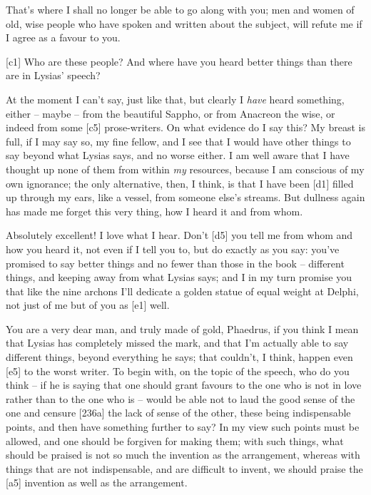  That's where I shall no longer be able to go along with you;
men and women of old, wise people who have spoken and written about the
subject, will refute me if I agree as a favour to you.

{[}c1{]}  Who are these people? And where have you heard better
things than there are in Lysias' speech?

 At the moment I can't say, just like that, but clearly I
{\em have} heard
something, either --
maybe -- from the beautiful Sappho, or from Anacreon the wise, or indeed
from some {[}c5{]}
prose-writers. On what
evidence do I say this? My breast is full, if I may say so, my fine
fellow, and I see that I would have other things to say beyond what
Lysias says, and no worse either. I am well aware that I have thought up
none of them from within {\em my} resources, because I am conscious of
my own ignorance; the only alternative, then, I think, is that I have
been {[}d1{]} filled up through my ears, like a vessel, from someone
else's streams. But dullness again has made me forget this very thing,
how I heard it and from whom.

 Absolutely
excellent! I love what I
hear. Don't {[}d5{]} you tell me from whom and how you heard it, not
even if I tell you to, but do exactly as you say: you've promised to say
better things and no fewer than those in the book -- different things,
and keeping away from what Lysias says; and I in my turn promise you
that like the nine
archons I'll dedicate a
golden statue of equal weight at Delphi, not just of me but of you as
{[}e1{]} well.

 You are a very dear man, and truly made of gold, Phaedrus, if
you think I mean that Lysias has completely missed the mark, and that
I'm actually able to say different things, beyond everything he says;
that couldn't, I think, happen even {[}e5{]} to the worst writer. To
begin with, on the topic of the speech, who do you think -- if he is
saying that one should grant favours to the one who is not in love
rather than to the one who is -- would be able not to laud the good
sense of the one and censure {[}236a{]} the lack of sense of the other,
these being indispensable points, and then have something further to
say? In my view such points must be allowed, and one should be forgiven
for making them; with such things, what should be praised is not so much
the invention as the arrangement, whereas with things that are not
indispensable, and are difficult to invent, we should praise the
{[}a5{]} invention as well as the arrangement.


